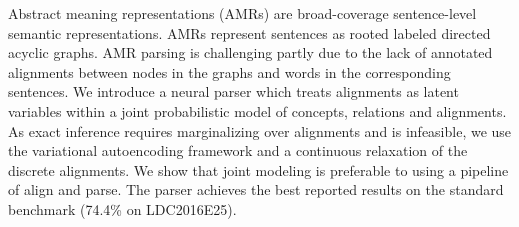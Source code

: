 Abstract meaning representations (AMRs) are broad-coverage sentence-level semantic representations. AMRs represent sentences as rooted labeled directed acyclic graphs. AMR parsing is challenging partly due to the lack of annotated alignments between nodes in the graphs and words in the corresponding sentences. We introduce a neural parser which treats alignments as latent variables within a joint probabilistic model of concepts, relations and alignments. As exact inference requires marginalizing over alignments and is infeasible, we use the variational autoencoding framework and a continuous relaxation of the discrete alignments. We show that joint modeling is preferable to using a pipeline of align and parse. The parser achieves the best reported results on the standard benchmark (74.4\% on LDC2016E25).
